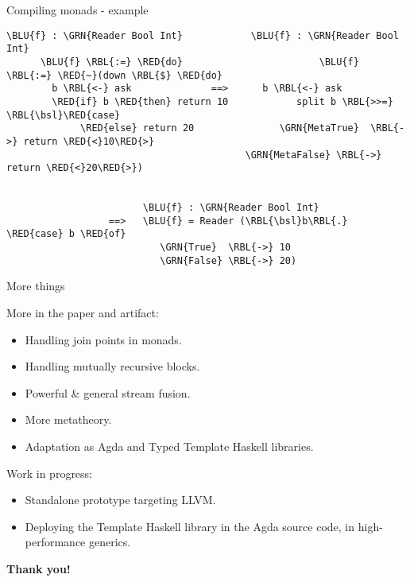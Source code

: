 \documentclass[dvipsnames,aspectratio=169]{beamer}
\theoremstyle{remark}
\newcommand{\RED}[1]{{\color{BrickRed} #1}}
\newcommand{\GRN}[1]{{\color{OliveGreen} #1}}
\newcommand{\RBL}[1]{{\color{RoyalBlue} #1}}
\newcommand{\BLU}[1]{{\color{Blue} #1}}
\newcommand{\bsl}{\textbackslash}
\begin{document}
\begin{frame}[fragile]{Compiling monads - example}

\begin{Verbatim}[commandchars=\\\{\}]
      \BLU{f} : \GRN{Reader Bool Int}            \BLU{f} : \GRN{Reader Bool Int}
      \BLU{f} \RBL{:=} \RED{do}                        \BLU{f} \RBL{:=} \RED{~}(down \RBL{$} \RED{do}
        b \RBL{<-} ask              ==>      b \RBL{<-} ask
        \RED{if} b \RED{then} return 10            split b \RBL{>>=} \RBL{\bsl}\RED{case}
             \RED{else} return 20               \GRN{MetaTrue}  \RBL{->} return \RED{<}10\RED{>}
                                          \GRN{MetaFalse} \RBL{->} return \RED{<}20\RED{>})


                        \BLU{f} : \GRN{Reader Bool Int}
                  ==>   \BLU{f} = Reader (\RBL{\bsl}b\RBL{.} \RED{case} b \RED{of}
                           \GRN{True}  \RBL{->} 10
                           \GRN{False} \RBL{->} 20)
\end{Verbatim}


\end{frame}




\begin{frame}{More things}

More in the paper and artifact:
\begin{itemize}
  \item Handling join points in monads.
  \item Handling mutually recursive blocks.
  \item Powerful \& general stream fusion.
  \item More metatheory.
  \item Adaptation as Agda and Typed Template Haskell libraries.
\end{itemize}
\vspace{1em}

Work in progress:
\begin{itemize}
\item Standalone prototype targeting LLVM.
\item Deploying the Template Haskell library in the Agda source code,
      in high-performance generics.
\end{itemize}

\pause
\begin{center}

  \Large{\textbf{Thank you!}}

\end{center}
\end{frame}
\end{document}
